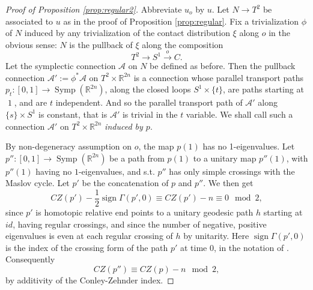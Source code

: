 \documentclass{amsart}
\numberwithin{equation}{section}
\theoremstyle{definition}
\theoremstyle{remark}
\DeclareMathOperator {\sign} {sign}
\DeclareMathOperator {\Symp} {Symp}
\DeclareMathOperator{\id}{\mathrm{1}}
\begin{document}
\begin{proof}[Proof of Proposition \ref{prop:regular2}]
Abbreviate $u _{o} $ by $u$. Let $N \to T ^{2} $ be associated to $u$ as in the proof of Proposition \ref{prop:regular}.
Fix a trivialization $\phi$ of $N$ induced by any trivialization of the
contact distribution $\xi$ along $o$ in the obvious sense: $N$
is the pullback of $\xi$ along the composition $$T ^{2} \to S ^{1}
\xrightarrow{o} C.  $$
Let the symplectic connection $\mathcal{A}$ on $N$ be defined as before. Then the pullback connection $\mathcal{A}' := \phi ^{*} \mathcal{A} $ on $T ^{2} \times \mathbb{R} ^{2n}  $ is a connection whose parallel transport 
paths $p _{t}: [0,1] \to \Symp (\mathbb{R} ^{2n} )$, along the closed loops $S ^{1} \times \{t\} $,
are paths starting at $\id$, and are $t$ independent. And so the parallel transport path of $\mathcal{A}'$ along $\{s\} \times S ^{1} $ is constant, that is $\mathcal{A}' 
$ is trivial in the $t$ variable. We shall call such a
connection $\mathcal{A}'$ on $T ^{2} \times
\mathbb{R} ^{2n}  $ \emph{induced by $p$}.  

   By non-degeneracy assumption on $o$, the map $p(1) $
has no 1-eigenvalues. Let $p'': [0,1] \to \Symp (\mathbb{R} ^{2n} )$ be a path from $p (1)$ to a unitary
map $p'' (1)$, with $p'' (1) $ having no $1$-eigenvalues, and s.t. $p''$
has only simple crossings with the Maslov cycle. Let $p'$ be the concatenation of $p$ and $p''$. We then get  $$CZ (p') - \frac{1}{2}\sign \Gamma (p', 0) \equiv
CZ (p') - n \equiv 0 \mod {2}, $$ since
$p'$ is homotopic relative end points to a unitary geodesic path $h$ starting at
$id$, having regular crossings, and since the number of
negative, positive eigenvalues is even at each regular crossing of $h$ by unitarity.  Here $\sign \Gamma (p', 0)$ is the index of the crossing form of the path $p'$ at time $0$, in the notation of \cite{citeRobbinSalamonTheMaslovindexforpaths.}.
Consequently
  \begin{equation} \label{eq:mod2}
  CZ (p'') \equiv CZ (p) -n \mod {2},
  \end{equation} 
    by additivity of
the Conley-Zehnder index. 
   

\end{proof}
\end{document}
